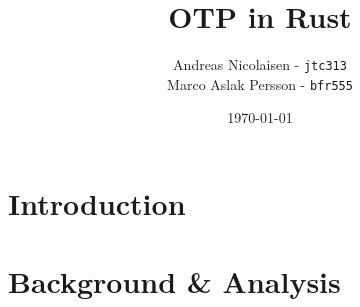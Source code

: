 \documentclass[a4paper]{article}
\title{OTP in Rust}
\author{Andreas Nicolaisen - \texttt{jtc313} \\ Marco Aslak Persson - \texttt{bfr555}}
\date{\today}
\begin{document}

\maketitle

\section{Introduction}

\section{Background \& Analysis}




\end{document}
